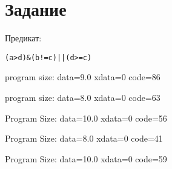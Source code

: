 
\isonefalse
\def \labnum {5}
\def \labsubj {Организация ЭВМ и систем}
\def \labauthor {Айтуганов Д. А. \\ Чебыкин И. Б.}
\def \labgroup {P3301}
\def \labinsp {Скорубский В. И.}
\def \labname {Вариант: 3}

\isnametrue
\lstset{
	caption=\lstname,
	captionpos=t,
	basicstyle=\ttfamily\selectfont\tiny
}


\section*{Задание}
Предикат:
\begin{verbatim}
(a>d)&(b!=c)||(d>=c)
\end{verbatim}

program size: data=9.0 xdata=0 code=86


program size: data=8.0 xdata=0 code=63


Program Size: data=10.0 xdata=0 code=56


Program Size: data=8.0 xdata=0 code=41


Program Size: data=10.0 xdata=0 code=59

